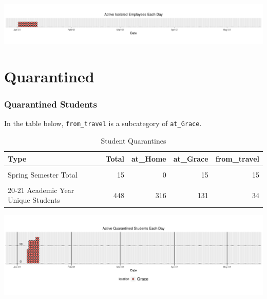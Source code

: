 \documentclass[
]{article}
\begin{document}
\includegraphics{Grace_internal4_files/figure-latex/unnamed-chunk-9-1.pdf}

\newpage

\hypertarget{quarantined}{%
\section{Quarantined}\label{quarantined}}

\hypertarget{quarantined-students}{%
\subsubsection{Quarantined Students}\label{quarantined-students}}

In the table below, \texttt{from\_travel} is a subcategory of
\texttt{at\_Grace}.

\begin{table}[!h]

\caption{\label{tab:unnamed-chunk-10}Student Quarantines}
\centering
\begin{tabular}[t]{lrrrr}
\toprule
Type & Total & at\_Home & at\_Grace & from\_travel\\
\midrule
\cellcolor{gray!6}{Active on Tue Jan 12} & \cellcolor{gray!6}{15} & \cellcolor{gray!6}{0} & \cellcolor{gray!6}{15} & \cellcolor{gray!6}{15}\\
Spring Semester Total & 15 & 0 & 15 & 15\\
\cellcolor{gray!6}{20-21 Academic Year Total} & \cellcolor{gray!6}{486} & \cellcolor{gray!6}{345} & \cellcolor{gray!6}{140} & \cellcolor{gray!6}{40}\\
20-21 Academic Year Unique Students & 448 & 316 & 131 & 34\\
\bottomrule
\end{tabular}
\end{table}

\includegraphics{Grace_internal4_files/figure-latex/unnamed-chunk-11-1.pdf}
\end{document}
